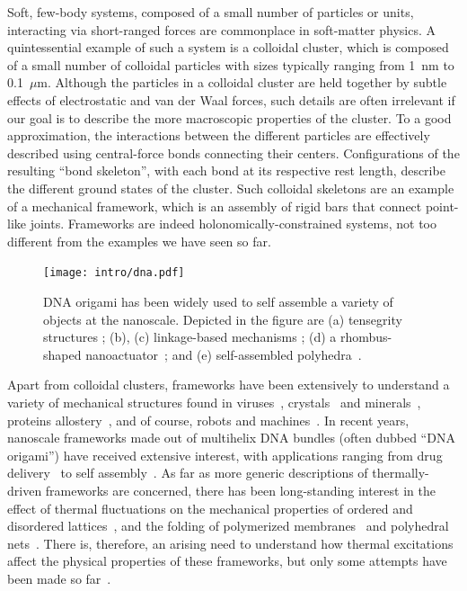 Soft, few-body systems, composed of a small number of particles or units, interacting via short-ranged forces are commonplace in soft-matter physics.
A quintessential example of such a system is a colloidal cluster, which is composed of a small number of colloidal particles with sizes typically ranging from 1~nm to 0.1~$\mu$m.
Although the particles in a colloidal cluster are held together by subtle effects of electrostatic and van der Waal forces, such details are often irrelevant if our goal is to describe the more macroscopic properties of the cluster.
To a good approximation, the interactions between the different particles are effectively described using central-force bonds connecting their centers.
Configurations of the resulting ``bond skeleton'', with each bond at its respective rest length, describe the different ground states of the cluster.
Such colloidal skeletons are an example of a mechanical framework, which is an assembly of rigid bars that connect point-like joints.
Frameworks are indeed holonomically-constrained systems, not too different from the examples we have seen so far.
%
\begin{figure}
  \begin{center}
    \texttt{[image: intro/dna.pdf]}
  \end{center}
  \caption{DNA origami has been widely used to self assemble a variety of objects at the nanoscale.
Depicted in the figure are (a) tensegrity structures \cite{liedl2010}; (b), (c) linkage-based mechanisms \cite{marras2015,zhou2015}; (d) a rhombus-shaped nanoactuator~\cite{ke2016}; and (e) self-assembled polyhedra~\cite{iinuma2014}.}
  \label{fig:dna_origami}
\end{figure}



Apart from colloidal clusters, frameworks have been extensively to understand a variety of mechanical structures found in viruses~\cite{hespenheide2004},
crystals~\cite{power2014} and minerals~\cite{kapko2011},
proteins allostery~\cite{gaspar2012}, and of course,
robots and machines~\cite{farber2008,donelan2007}.
In recent years, nanoscale frameworks made out of multihelix DNA bundles (often dubbed ``DNA origami'') have received extensive interest, with applications ranging from drug delivery~\cite{zhao2019} to self assembly~\cite{liedl2010}.
As far as more generic descriptions of thermally-driven frameworks are concerned, there has been long-standing interest in the effect of thermal fluctuations on the mechanical properties of ordered and disordered lattices~\cite{zhang2016,woodhouse2018,yan2018}, and the folding of polymerized membranes~\cite{di-francesco2000,nelson2004} and polyhedral nets~\cite{shenoy2012,dodd2018,melo2020}.
There is, therefore, an arising need to understand how thermal excitations affect the physical properties of these frameworks, but only some attempts have been made so far~\cite{kallus2017,rocklin2018}.

